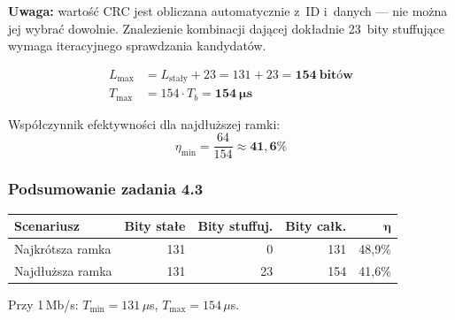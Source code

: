 \documentclass[12pt,a4paper]{article}
\begin{document}
\textbf{Uwaga:} wartość CRC jest obliczana automatycznie z~ID i~danych —
nie można jej wybrać dowolnie. Znalezienie kombinacji dającej dokładnie 23~bity
stuffujące wymaga iteracyjnego sprawdzania kandydatów.

\begin{align*}
L_{\max} &= L_{\text{stały}} + 23 = 131 + 23 = \mathbf{154\ \text{bitów}} \\
T_{\max} &= 154 \cdot T_b = \mathbf{154\ \mu\text{s}}
\end{align*}

Współczynnik efektywności dla najdłuższej ramki:
\begin{equation}
\eta_{\min} = \frac{64}{154} \approx \mathbf{41{,}6\%}
\end{equation}

\subsubsection*{Podsumowanie zadania 4.3}

\begin{center}
\begin{tabular}{lrrrr}
\toprule
\textbf{Scenariusz} & \textbf{Bity stałe} & \textbf{Bity stuffuj.} & \textbf{Bity całk.} & $\bm{\eta}$ \\
\midrule
Najkrótsza ramka & 131 & 0  & 131 & 48,9\% \\
Najdłuższa ramka & 131 & 23 & 154 & 41,6\% \\
\bottomrule
\end{tabular}
\end{center}

Przy 1\,Mb/s: $T_{\min} = 131\,\mu$s, $T_{\max} = 154\,\mu$s.
\end{document}
